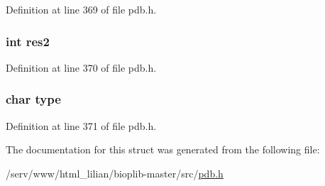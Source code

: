 Definition at line 369 of file pdb.\-h.

\hypertarget{structsec__entry_ab2a9ff6fb3a64621cb23e1eb1290e043}{
\subsubsection[{res2}]{\setlength{\rightskip}{0pt plus 5cm}int res2}}\label{structsec__entry_ab2a9ff6fb3a64621cb23e1eb1290e043}


Definition at line 370 of file pdb.\-h.

\hypertarget{structsec__entry_aff17911edc8208aa8ddb1c7c52c78389}{
\subsubsection[{type}]{\setlength{\rightskip}{0pt plus 5cm}char type}}\label{structsec__entry_aff17911edc8208aa8ddb1c7c52c78389}


Definition at line 371 of file pdb.\-h.



The documentation for this struct was generated from the following file\-:\begin{DoxyCompactItemize}
\item 
/serv/www/html\-\_\-lilian/bioplib-\/master/src/\hyperlink{pdb_8h}{pdb.\-h}\end{DoxyCompactItemize}
